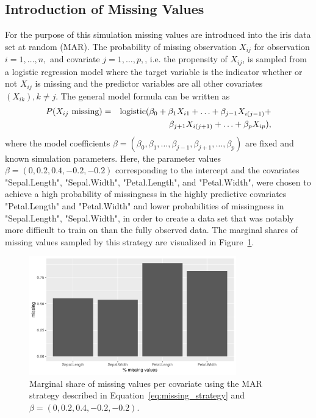\documentclass[12pt, twoside]{article}
\newcommand{\1}{\mathbb{1}}
\begin{document}
\subsection{Introduction of Missing Values}\label{missing_values}
For the purpose of this simulation missing values are introduced into the iris data set at random (MAR). The probability of missing observation $X_{ij}$ for observation $i = 1, \ldots, n,$ and covariate $j = 1, \ldots, p,$, i.e. the propensity of $X_{ij}$, is sampled from a logistic regression model where the target variable is the indicator whether or not $X_{ij}$ is missing and the predictor variables are all other covariates $(X_{ik}), k \neq j$. The general model formula can be written as
\begin{eqnarray} \label{eq:missing_strategy}
P(X_{ij} \text{ missing}) &=& \text{logistic}(\beta_0 + \beta_1 X_{i1} + \ldots + \beta_{j - 1} X_{i(j - 1)} + \nonumber \\
&& \hspace{1.4cm}  \beta_{j + 1} X_{i(j + 1)} + \ldots + \beta_p X_{ip}),
\end{eqnarray}
where the model coefficients $\beta = (\beta_0, \beta_1, \ldots, \beta_{j - 1}, \beta_{j+1}, \ldots, \beta_p)$ are fixed and known simulation parameters.
Here, the parameter values $\beta = (0, 0.2, 0.4, -0.2, -0.2)$ corresponding to the intercept and the covariates "Sepal.Length", "Sepal.Width", "Petal.Length", and "Petal.Width", were chosen to achieve a high probability of missingness in the highly predictive covariates "Petal.Length" and "Petal.Width" and lower probabilities of missingness in "Sepal.Length", "Sepal.Width", in order to create a data set that was notably more difficult to train on than the fully observed data. The marginal shares of missing values sampled by this strategy are visualized in Figure~\ref{fig:marginal_missing}.

\begin{figure}[hp]
	\centering
	\includegraphics[width=0.8\textwidth]{plots/iris_data_missingness.pdf}
	\caption{Marginal share of missing values per covariate using the MAR strategy described in Equation~\eqref{eq:missing_strategy} and $\beta = (0, 0.2, 0.4, -0.2, -0.2)$.}
	\label{fig:marginal_missing}
\end{figure}
\end{document}
